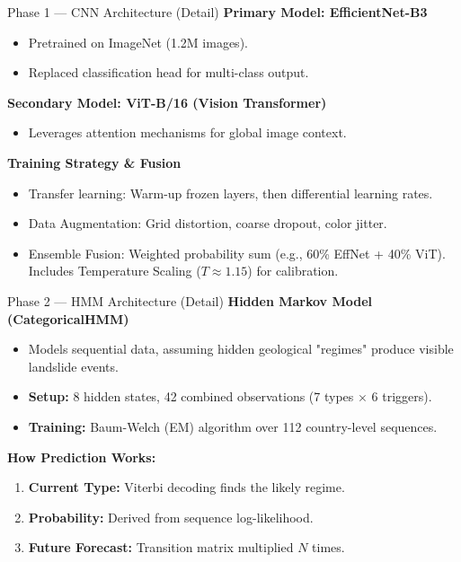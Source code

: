 \documentclass[11pt]{beamer}
\begin{document}
\begin{frame}{Phase 1 — CNN Architecture (Detail)}
    \textbf{Primary Model: EfficientNet-B3}
    \begin{itemize}
        \item Pretrained on ImageNet (1.2M images).
        \item Replaced classification head for multi-class output.
    \end{itemize}
    \textbf{Secondary Model: ViT-B/16 (Vision Transformer)}
    \begin{itemize}
        \item Leverages attention mechanisms for global image context.
    \end{itemize}
    \textbf{Training Strategy \& Fusion}
    \begin{itemize}
        \item Transfer learning: Warm-up frozen layers, then differential learning rates.
        \item Data Augmentation: Grid distortion, coarse dropout, color jitter.
        \item Ensemble Fusion: Weighted probability sum (e.g., 60\% EffNet + 40\% ViT). Includes Temperature Scaling ($T \approx 1.15$) for calibration.
    \end{itemize}
\end{frame}

\begin{frame}{Phase 2 — HMM Architecture (Detail)}
    \textbf{Hidden Markov Model (CategoricalHMM)}
    \begin{itemize}
        \item Models sequential data, assuming hidden geological "regimes" produce visible landslide events.
        \item \textbf{Setup:} 8 hidden states, 42 combined observations (7 types $\times$ 6 triggers).
        \item \textbf{Training:} Baum-Welch (EM) algorithm over 112 country-level sequences.
    \end{itemize}
    \vspace{0.3cm}
    \textbf{How Prediction Works:}
    \begin{enumerate}
        \item \textbf{Current Type:} Viterbi decoding finds the likely regime.
        \item \textbf{Probability:} Derived from sequence log-likelihood.
        \item \textbf{Future Forecast:} Transition matrix multiplied $N$ times.
    \end{enumerate}
\end{frame}
\end{document}
